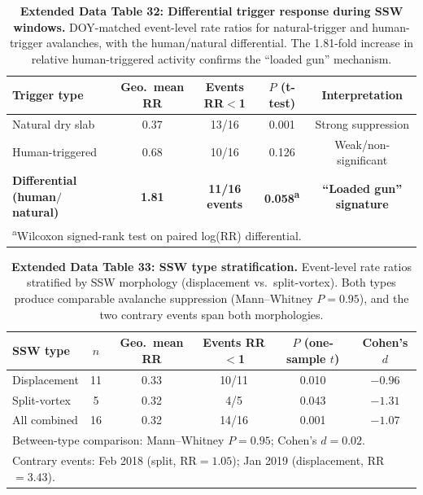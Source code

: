 \documentclass[11pt,letterpaper]{article}
\begin{document}
\begin{table}[htbp]
\centering
\caption{\textbf{Extended Data Table 32: Differential trigger response during SSW windows.} DOY-matched event-level rate ratios for natural-trigger and human-trigger avalanches, with the human/natural differential. The 1.81-fold increase in relative human-triggered activity confirms the ``loaded gun'' mechanism.}
\label{tab:trigger_differential}
\small
\begin{tabular}{lcccc}
\toprule
\textbf{Trigger type} & \textbf{Geo.\ mean RR} & \textbf{Events RR$<$1} & \textbf{$P$ (t-test)} & \textbf{Interpretation} \\
\midrule
Natural dry slab & 0.37 & 13/16 & 0.001 & Strong suppression \\
Human-triggered & 0.68 & 10/16 & 0.126 & Weak/non-significant \\
\midrule
\textbf{Differential (human$/$natural)} & \textbf{1.81} & \textbf{11/16 events} & \textbf{0.058\textsuperscript{a}} & \textbf{``Loaded gun'' signature} \\
\bottomrule
\multicolumn{5}{l}{\footnotesize \textsuperscript{a}Wilcoxon signed-rank test on paired log(RR) differential.} \\
\end{tabular}
\end{table}

\begin{table}[htbp]
\centering
\caption{\textbf{Extended Data Table 33: SSW type stratification.} Event-level rate ratios stratified by SSW morphology (displacement vs.\ split-vortex). Both types produce comparable avalanche suppression (Mann--Whitney $P = 0.95$), and the two contrary events span both morphologies.}
\label{tab:ssw_type}
\small
\begin{tabular}{lccccc}
\toprule
\textbf{SSW type} & \textbf{$n$} & \textbf{Geo.\ mean RR} & \textbf{Events RR$<$1} & \textbf{$P$ (one-sample $t$)} & \textbf{Cohen's $d$} \\
\midrule
Displacement & 11 & 0.33 & 10/11 & 0.010 & $-0.96$ \\
Split-vortex & 5 & 0.32 & 4/5 & 0.043 & $-1.31$ \\
\midrule
All combined & 16 & 0.32 & 14/16 & 0.001 & $-1.07$ \\
\bottomrule
\multicolumn{6}{l}{\footnotesize Between-type comparison: Mann--Whitney $P = 0.95$; Cohen's $d = 0.02$.} \\
\multicolumn{6}{l}{\footnotesize Contrary events: Feb 2018 (split, RR$=1.05$); Jan 2019 (displacement, RR$=3.43$).} \\
\end{tabular}
\end{table}
\end{document}
